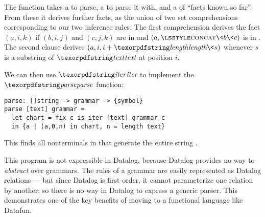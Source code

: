 
\noindent
The function  takes a  to parse, a  to parse
it with, and a  of ``facts known so far''. From these it derives
further facts, as the union of two set comprehensions corresponding to our two
inference rules. The first comprehension derives the fact $(a,i,k)$ if $(b,i,j)$
and $(c,j,k)$ are in  and $(a, \ctor{Concat} \<b \< c)$ is in
. The second clause derives $(a, i, i + \name{length}\<s)$
whenever $s$ is a substring of $\name{text}$ at position $i$.

We can then use $\name{iter}$ to implement the $\name{parse}$ function: 

\begin{verbatim}
parse: []string -> grammar -> {symbol}
parse [text] grammar =
  let chart = fix c is iter [text] grammar c
  in {a | (a,0,n) in chart, n = length text}
\end{verbatim}

\noindent
This finds all nonterminals in  that generate the entire string
. 


This program is not expressible in Datalog, because Datalog provides no way to
\emph{abstract} over grammars. The rules of a grammar are easily represented as
Datalog relations --- but since Datalog is first-order, it cannot parameterize
one relation by another; so there is no way in Datalog to express a generic
parser. This demonstrates one of the key benefits of moving to a functional
language like Datafun. 

